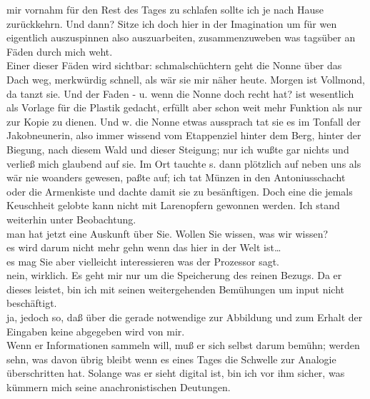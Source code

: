 \documentclass[
]{article}
\begin{document}
mir vornahm für den Rest des Tages zu schlafen sollte ich je nach Hause
zurückkehrn. Und dann? Sitze ich doch hier in der Imagination um für wen
eigentlich auszuspinnen also auszuarbeiten, zusammenzuweben was tagsüber
an Fäden durch mich weht.\\
Einer dieser Fäden wird sichtbar: schmalschüchtern geht die Nonne über
das Dach weg, merkwürdig schnell, als wär sie mir näher heute. Morgen
ist Vollmond, da tanzt sie. Und der Faden - u. wenn die Nonne doch recht
hat? ist wesentlich als Vorlage für die Plastik gedacht, erfüllt aber
schon weit mehr Funktion als nur zur Kopie zu dienen. Und w. die Nonne
etwas aussprach tat sie es im Tonfall der Jakobneunerin, also immer
wissend vom Etappenziel hinter dem Berg, hinter der Biegung, nach diesem
Wald und dieser Steigung; nur ich wußte gar nichts und verließ mich
glaubend auf sie. Im Ort tauchte s. dann plötzlich auf neben uns als wär
nie woanders gewesen, paßte auf; ich tat Münzen in den Antoniusschacht
oder die Armenkiste und dachte damit sie zu besänftigen. Doch eine die
jemals Keuschheit gelobte kann nicht mit Larenopfern gewonnen werden.
Ich stand weiterhin unter Beobachtung.\\
man hat jetzt eine Auskunft über Sie. Wollen Sie wissen, was wir
wissen?\\
es wird darum nicht mehr gehn wenn das hier in der Welt ist\ldots{}\\
es mag Sie aber vielleicht interessieren was der Prozessor sagt.\\
nein, wirklich. Es geht mir nur um die Speicherung des reinen Bezugs. Da
er dieses leistet, bin ich mit seinen weitergehenden Bemühungen um input
nicht beschäftigt.\\
ja, jedoch so, daß über die gerade notwendige zur Abbildung und zum
Erhalt der Eingaben keine abgegeben wird von mir.\\
Wenn er Informationen sammeln will, muß er sich selbst darum bemühn;
werden sehn, was davon übrig bleibt wenn es eines Tages die Schwelle zur
Analogie überschritten hat. Solange was er sieht digital ist, bin ich
vor ihm sicher, was kümmern mich seine anachronistischen Deutungen.
\end{document}
